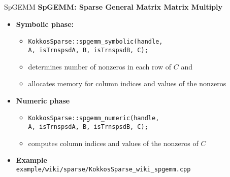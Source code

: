 \begin{frame}[fragile]{SpGEMM}
\textbf{SpGEMM: Sparse General Matrix Matrix Multiply}

\vspace{.4cm}

\begin{itemize}
\item \textbf{Symbolic phase:} 
  \begin{itemize} 
  \item \texttt{KokkosSparse::spgemm\_symbolic(handle, \\ 
    \hspace{2.9cm}A, isTrnspsdA, B, isTrnspsdB, C);} 
  \item determines number of nonzeros in each row of $C$ and
  \item allocates memory for column indices and values of the nonzeros
  \end{itemize} 

  \vspace{.4cm}

\item \textbf{Numeric phase}
  \begin{itemize}
  \item \texttt{KokkosSparse::spgemm\_numeric(handle, \\ 
    \hspace{2.7cm}A, isTrnspsdA, B, isTrnspsdB, C);}
  \item computes column indices and values of the nonzeros of $C$
  \end{itemize}

  \vspace{.4cm}

\item \textbf{Example}\\[-3ex]
  \hspace{1em} \texttt{example/wiki/sparse/KokkosSparse\_wiki\_spgemm.cpp}
\end{itemize}  
\end{frame}


